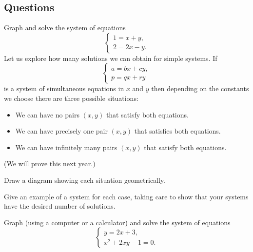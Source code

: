 \subsection*{Questions}
\begin{questions}
  \question Graph and solve the system of equations
            \begin{displaymath}
              \begin{cases}
                1 = x + y,\\
                2 = 2x - y.
              \end{cases}
            \end{displaymath}
  \question Let us explore how many solutions we can obtain for simple systems. If
            \begin{displaymath}
              \begin{cases}
                a = bx + cy,\\
                p = qx + ry
              \end{cases}
            \end{displaymath}
            is a system of simultaneous equations in $ x $ and $ y $ then depending on the constants we choose there are
            three possible situations:
            \begin{itemize}
              \item We can have no pairs $ (x,y) $ that satisfy both equations.
              \item We can have precisely one pair $ (x,y) $ that satisfies both equations.
              \item We can have infinitely many pairs $ (x,y) $ that satisfy both equations.
            \end{itemize}
            (We will prove this next year.)
    \begin{parts}
      \item Draw a diagram showing each situation geometrically.
      \item Give an example of a system for each case, taking care to show that your systems
            have the desired number of solutions.
    \end{parts}
  \question Graph (using a computer or a calculator) and solve the system of equations
            \begin{displaymath}
              \begin{cases}
                y = 2x + 3,\\
                x^2 + 2xy - 1 = 0.
              \end{cases}

\end{displaymath}
\end{questions}
